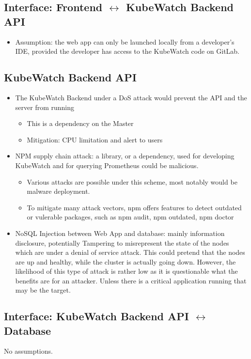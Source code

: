 \subsection{Interface: Frontend \(\leftrightarrow\) KubeWatch Backend API}
\begin{itemize}
    \item Assumption: the web app can only be launched locally from a developer's IDE, provided the developer has access to the KubeWatch code on GitLab.
\end{itemize}

\subsection{KubeWatch Backend API}
\begin{itemize}
    \item The KubeWatch Backend under a DoS attack would prevent the API and the server from running
        \begin{itemize}
            \item This is a dependency on the Master
            \item Mitigation: CPU limitation and alert to users
        \end{itemize}
    \item NPM supply chain attack: a library, or a dependency, used for developing KubeWatch and for querying Prometheus could be malicious.
        \begin{itemize}
            \item Various attacks are possible under this scheme, most notably would be malware deployment.
            \item To mitigate many attack vectors, npm offers features to detect outdated or vulerable packages, such as npm audit, npm outdated, npm doctor
        \end{itemize} 
    \item NoSQL Injection between Web App and database: mainly information disclosure, potentially Tampering to misrepresent the state of the nodes which are under a denial of service attack. This could pretend that the nodes are up and healthy, while the cluster is actually going down. However, the likelihood of this type of attack is rather low as it is questionable what the benefits are for an attacker. Unless there is a critical application running that may be the target.  
\end{itemize}

\subsection{Interface: KubeWatch Backend API \(\leftrightarrow\) Database}
No assumptions.

